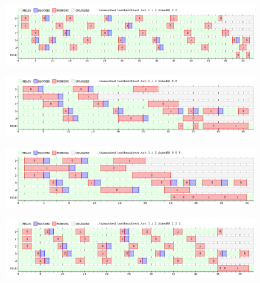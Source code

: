 \begin{figure}[H]
  \centering
\includegraphics[scale=0.45]{graficos/ejercicio7/2testTask1.png}
  \caption[Task Batch con un nucleo y quantum 6]{}
\end{figure}


\begin{figure}[H]
  \centering
\includegraphics[scale=0.45]{graficos/ejercicio7/2testTask3.png}
  \caption[Task Batch con un nucleo y quantum 6]{}
\end{figure}


\begin{figure}[H]
  \centering
\includegraphics[scale=0.45]{graficos/ejercicio7/3testTask1.png}
  \caption[Task Batch con un nucleo y  quantum 8]{}
\end{figure}


\begin{figure}[H]
  \centering
\includegraphics[scale=0.45]{graficos/ejercicio7/3testTask3.png}
  \caption[Task Batch con un nucleo y  quantum 8]{}
\end{figure}
 
